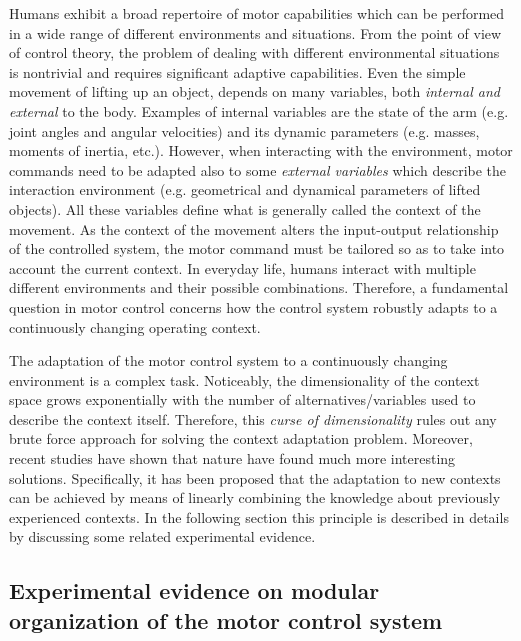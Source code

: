 \documentclass{svmult}
\begin{document}
Humans exhibit a broad repertoire of motor capabilities which can be
performed in a wide range of different environments and situations.
From the point of view of control theory, the problem of dealing
with different environmental situations is nontrivial and requires
significant adaptive capabilities. Even the simple movement of
lifting up an object, depends on many variables, both {\em internal
and external} to the body.
Examples of internal variables
are the state of the arm (e.g. joint angles and angular velocities)
and its dynamic parameters (e.g. masses, moments of inertia, etc.).
However, when interacting with the environment, motor commands need
to be adapted also to some {\em external variables}
which describe the interaction environment (e.g. geometrical and 
dynamical parameters of lifted objects).
All these variables define what is generally called the context of
the movement. As the context of the movement alters the input-output
relationship of the controlled system, the motor command must be
tailored so as to take into account the current context. In everyday
life, humans interact with multiple different environments and their
possible combinations. Therefore, a fundamental question in motor
control concerns how the control system robustly adapts to a continuously
changing operating context.

The adaptation of the motor control system to a continuously 
changing environment is a complex task. Noticeably, the dimensionality
of the context space grows exponentially with the number 
of alternatives/variables used to describe the context itself.
Therefore, this {\em curse of dimensionality} rules out any 
brute force approach for solving the context adaptation problem.
Moreover, recent studies have shown that nature have 
found much more interesting solutions. Specifically, it has been
proposed that the adaptation to new contexts can be achieved by means of 
linearly combining the knowledge about previously experienced contexts.
In the following section this principle is described in details by 
discussing some related experimental evidence.

\subsection{Experimental evidence on modular organization of the motor control system}
\label{Sec:ExpEvid}
\end{document}
